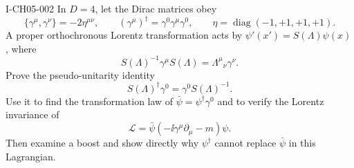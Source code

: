 \begin{exercise}{I-CH05-002}
In $D=4$, let the Dirac matrices obey
\begin{equation*}
  \{\gamma^\mu,\gamma^\nu\}=-2\eta^{\mu\nu},
  \qquad
  (\gamma^\mu)^\dagger=\gamma^0\gamma^\mu\gamma^0,
  \qquad \eta=\operatorname{diag}(-1,+1,+1,+1).
\end{equation*}
A proper orthochronous Lorentz transformation acts by
$\psi'(x')=S(\Lambda)\psi(x)$, where
\begin{equation*}
  S(\Lambda)^{-1}\gamma^\mu S(\Lambda)
  =\Lambda^\mu{}_{\nu}\gamma^\nu.
\end{equation*}
Prove the pseudo-unitarity identity
\begin{equation*}
  S(\Lambda)^\dagger\gamma^0=\gamma^0S(\Lambda)^{-1}.
\end{equation*}
Use it to find the transformation law of
$\bar\psi=\psi^\dagger\gamma^0$ and to verify the Lorentz invariance of
\begin{equation*}
  \mathcal L=\bar\psi(-\ii\gamma^\mu\partial_\mu-m)\psi.
\end{equation*}
Then examine a boost and show directly why $\psi^\dagger$ cannot replace
$\bar\psi$ in this Lagrangian.
\end{exercise}
